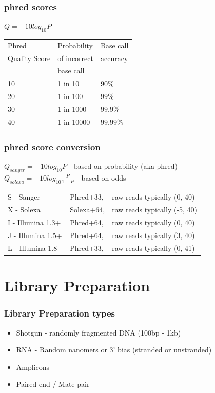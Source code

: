 \documentclass[pdf]{beamer}
\begin{document}
\begin{frame}
  \frametitle{phred scores}
$Q = -10log_{10}P$
\begin{center}
\begin{tabular}{|l|l|l|}
\hline
Phred & Probability &	Base call \\
Quality Score	& of incorrect  & accuracy \\
 & base call & \\
\hline
10	&	1 in 10	&	$90\%$\\
20	&	1 in 100 &	$99\%$\\
30	&	1 in 1000	&	$99.9\%$\\
40	&	1 in 10000	&	$99.99\%$\\
\hline
\end{tabular}
\end{center}
\end{frame}
\begin{frame}
  \frametitle{phred score conversion}
$Q_{sanger} = -10log_{10}P$ - based on probability (aka phred)
\\

$Q_{solexa} = -10log_{10}\frac{P}{1-P}$ - based on odds
\begin{center}
\begin{tabular}{ l l l }
S - Sanger        &Phred+33,  &raw reads typically (0, 40) \\
X - Solexa        &Solexa+64, &raw reads typically (-5, 40) \\
I - Illumina 1.3+ &Phred+64,  &raw reads typically (0, 40) \\
J - Illumina 1.5+ &Phred+64,  &raw reads typically (3, 40) \\
L - Illumina 1.8+ &Phred+33,  &raw reads typically (0, 41) \\
\end{tabular}
\end{center}
\end{frame} 


\section{Library Preparation}
\begin{frame}
 \frametitle{Library Preparation types}
 \begin{itemize}
 \item Shotgun - randomly fragmented DNA (100bp - 1kb) 
 \item RNA - Random nanomers or 3' bias (stranded or unstranded)
 \item Amplicons
 \item Paired end / Mate pair
 \end{itemize}
\end{frame} 
\end{document}
